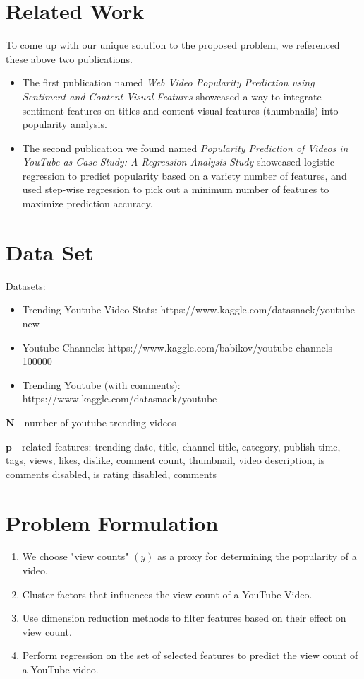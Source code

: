 \documentclass[english]{article}
\begin{document}
\section{Related Work}
To come up with our unique solution to the proposed problem, we referenced these above two publications. 
\begin{itemize}
    \item The first publication named \textit{Web Video Popularity Prediction using Sentiment and Content Visual Features} \cite{vp1} showcased a way to integrate sentiment features on titles and content visual features (thumbnails) into popularity analysis.
    \item The second publication we found named \textit{Popularity Prediction of Videos in YouTube as Case Study: A Regression Analysis Study} \cite{vp2} showcased logistic regression to predict popularity based on a variety number of features, and used step-wise regression to pick out a minimum number of features to maximize prediction accuracy.
\end{itemize}

\section{Data Set}
Datasets:
\begin{itemize}
\item Trending Youtube Video Stats: https://www.kaggle.com/datasnaek/youtube-new
\item Youtube Channels: https://www.kaggle.com/babikov/youtube-channels-100000
\item Trending Youtube (with comments): https://www.kaggle.com/datasnaek/youtube
\end{itemize}
\item $\textbf{N}$ - number of youtube trending videos
\item $\textbf{p}$ - related features: trending date, title, channel title, category, publish time, tags, views, likes, dislike, comment count, thumbnail, video description, is comments disabled, is rating disabled, comments


\section{Problem Formulation}
\begin{enumerate}
    \item We choose "view counts" $(y)$ as a proxy for determining the popularity of a video.
    \item Cluster factors that influences the view count of a YouTube Video.
    \item Use dimension reduction methods to filter features based on their effect on view count.
    \item Perform regression on the set of selected features to predict the view count of a YouTube video.
\end{enumerate}
\end{document}
